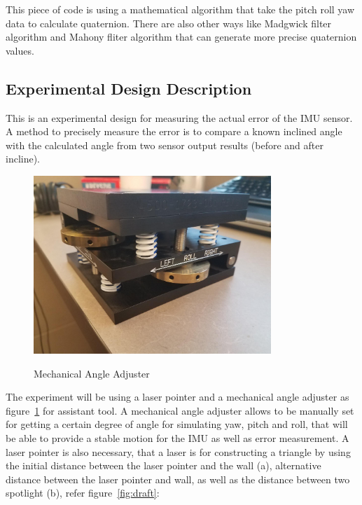 This piece of code is using a mathematical algorithm that take the pitch roll yaw data to calculate quaternion. There are also other ways like Madgwick filter algorithm and Mahony fliter algorithm that can generate more precise quaternion values.\\

\subsection{Experimental Design Description}
This is an experimental design for measuring the actual error of the IMU sensor. A method to precisely measure the error is to compare a known inclined angle with the calculated angle from two sensor output results (before and after incline). 

\begin{figure}
	\centering
 		\caption{Mechanical Angle Adjuster}
      	\includegraphics[width=0.8\textwidth,height=0.8\textheight,keepaspectratio]{img/widget}
    \label{fig:widget}
\end{figure}

The experiment will be using a laser pointer and a mechanical angle adjuster as figure~\ref{fig:widget} for assistant tool. A mechanical angle adjuster allows to be manually set for getting a certain degree of angle for simulating yaw, pitch and roll, that will be able to provide a stable motion for the IMU as well as error measurement. A laser pointer is also necessary, that a laser is for constructing a triangle by using the initial distance between the laser pointer and the wall (a), alternative distance between the laser pointer and wall, as well as the distance between two spotlight (b), refer figure~\ref{fig:draft}:

